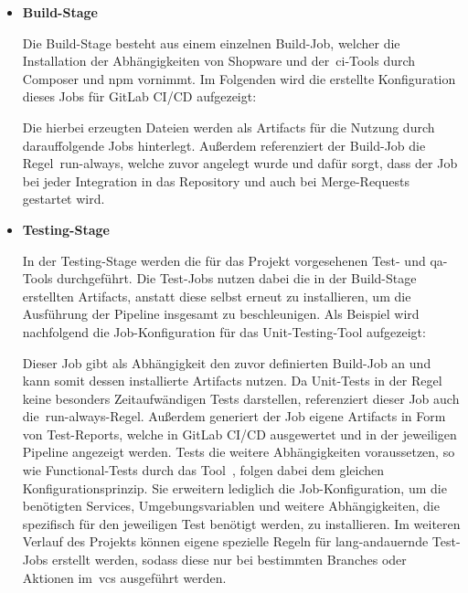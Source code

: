 \begin{itemize}
    \item {
        \textbf{Build-Stage}\par
        Die Build-Stage besteht aus einem einzelnen Build-Job, welcher die Installation der Abhängigkeiten
        von Shopware und der\ \acrshort{ci}-Tools durch Composer und \acrshort{npm} vornimmt.
        Im Folgenden wird die erstellte Konfiguration dieses Jobs für GitLab CI/CD aufgezeigt:

        \vspace{-2.3em}

        Die hierbei erzeugten Dateien werden als Artifacts für die Nutzung durch darauffolgende Jobs hinterlegt.
        Außerdem referenziert der Build-Job die Regel\ \glqq run-always\grqq, welche zuvor angelegt wurde und dafür
        sorgt, dass der Job bei jeder Integration in das Repository und auch bei Merge-Requests gestartet wird.
    }

    \item {
        \textbf{Testing-Stage}\par
        In der Testing-Stage werden die für das Projekt vorgesehenen Test- und \acrshort{qa}-Tools durchgeführt.
        Die Test-Jobs nutzen dabei die in der Build-Stage erstellten Artifacts, anstatt diese selbst erneut zu
        installieren, um die Ausführung der Pipeline insgesamt zu beschleunigen.
        Als Beispiel wird nachfolgend die Job-Konfiguration für das Unit-Testing-Tool  aufgezeigt:

        \vspace{-2.3em}

        Dieser Job gibt als Abhängigkeit den zuvor definierten Build-Job an und kann somit dessen installierte
        Artifacts nutzen.
        Da Unit-Tests in der Regel keine besonders Zeitaufwändigen Tests darstellen, referenziert dieser Job auch
        die\ \glqq run-always\grqq-Regel.
        Außerdem generiert der Job eigene Artifacts in Form von Test-Reports, welche in GitLab CI/CD ausgewertet
        und in der jeweiligen Pipeline angezeigt werden.
        Tests die weitere Abhängigkeiten voraussetzen, so wie Functional-Tests durch das Tool\ ,
        folgen dabei dem gleichen Konfigurationsprinzip.
        Sie erweitern lediglich die Job-Konfiguration, um die benötigten Services, Umgebungsvariablen und weitere
        Abhängigkeiten, die spezifisch für den jeweiligen Test benötigt werden, zu installieren.
        Im weiteren Verlauf des Projekts können eigene spezielle Regeln für lang-andauernde Test-Jobs erstellt
        werden, sodass diese nur bei bestimmten Branches oder Aktionen im\ \acrshort{vcs} ausgeführt werden.
    }


\end{itemize}
